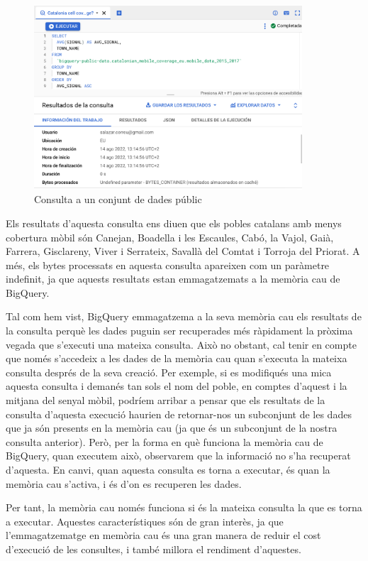 \documentclass[12pt,longbibliography]{article}
\theoremstyle{definition}
\theoremstyle{remark}
\begin{document}
\begin{figure}[h!]
\begin{center}
\includegraphics[width=10cm]{bq23}
\end{center}
\caption{Consulta a un conjunt de dades públic}
\label{fig:bq23}
\end{figure}


Els resultats d'aquesta consulta ens diuen que els pobles catalans amb menys cobertura mòbil són Canejan, Boadella i les Escaules, Cabó, la Vajol, Gaià, Farrera, Gisclareny, Viver i Serrateix, Savallà del Comtat i Torroja del Priorat. A més, els bytes processats en aquesta consulta apareixen com un paràmetre indefinit, ja que aquests resultats estan emmagatzemats a la memòria cau de BigQuery.



Tal com hem vist, BigQuery emmagatzema a la seva memòria cau els resultats de la consulta perquè les dades puguin ser recuperades més ràpidament la pròxima vegada que s'executi una mateixa consulta. Això no obstant, cal tenir en compte que només s'accedeix a les dades de la memòria cau quan s'executa la mateixa consulta després de la seva creació. Per exemple, si es modifiqués una mica aquesta consulta i demanés tan sols el nom del poble, en comptes d'aquest i la mitjana del senyal mòbil, podríem arribar a pensar que els resultats de la consulta d'aquesta execució haurien de retornar-nos un subconjunt de les dades que ja són presents en la memòria cau (ja que és un subconjunt de la nostra consulta anterior). Però, per la forma en què funciona la memòria cau de BigQuery, quan executem això, observarem que la informació no s'ha recuperat d'aquesta. En canvi, quan aquesta consulta es torna a executar, és quan la memòria cau s'activa, i és d'on es recuperen les dades. 



Per tant, la memòria cau només funciona si és la mateixa consulta la que es torna a executar. Aquestes característiques són de gran interès, ja que l'emmagatzematge en memòria cau és una gran manera de reduir el cost d'execució de les consultes, i també millora el rendiment d'aquestes. 
\end{document}
